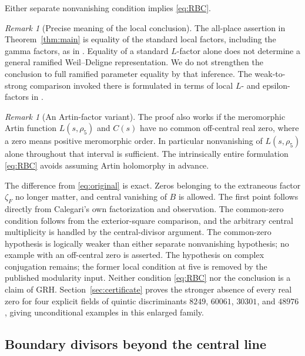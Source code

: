 \documentclass[11pt]{article}
\theoremstyle{definition}
\theoremstyle{remark}
\newtheorem{remark}[theorem]{Remark}
\newcommand{\rh}{\rho_5}
\numberwithin{equation}{section}
\begin{document}
Either separate nonvanishing condition implies \eqref{eq:RBC}.

\begin{remark}[Precise meaning of the local conclusion]\label{rem:local}
The all-place assertion in Theorem~\ref{thm:main} is equality of the standard local factors, including the gamma factors, as in \citet[Lemma 4.10]{calegari}. Equality of a standard $L$-factor alone does not determine a general ramified Weil--Deligne representation. We do not strengthen the conclusion to full ramified parameter equality by that inference.
The weak-to-strong comparison invoked there is formulated in terms of local $L$- and epsilon-factors in \citet[Proposition 4.1]{ramakrishnan}.
\end{remark}

\begin{remark}[An Artin-factor variant]\label{rem:weaker}
The proof also works if the meromorphic Artin function $L(s,\rh)$ and $C(s)$ have no common off-central real zero, where a zero means positive meromorphic order. In particular nonvanishing of $L(s,\rh)$ alone throughout that interval is sufficient. The intrinsically entire formulation \eqref{eq:RBC} avoids assuming Artin holomorphy in advance.
\end{remark}

The difference from \eqref{eq:original} is exact. Zeros belonging to the extraneous factor $\zeta_F$ no longer matter, and central vanishing of $B$ is allowed. The first point follows directly from Calegari's own factorization and observation. The common-zero condition follows from the exterior-square comparison, and the arbitrary central multiplicity is handled by the central-divisor argument. The common-zero hypothesis is logically weaker than either separate nonvanishing hypothesis; no example with an off-central zero is asserted. The hypothesis on complex conjugation remains; the former local condition at five is removed by the published modularity input. Neither condition \eqref{eq:RBC} nor the conclusion is a claim of GRH. Section~\ref{sec:certificate} proves the stronger absence of every real zero for four explicit fields of quintic discriminants $8249$, $60061$, $30301$, and $48976$, giving unconditional examples in this enlarged family.

\subsection*{Boundary divisors beyond the central line}
\end{document}
